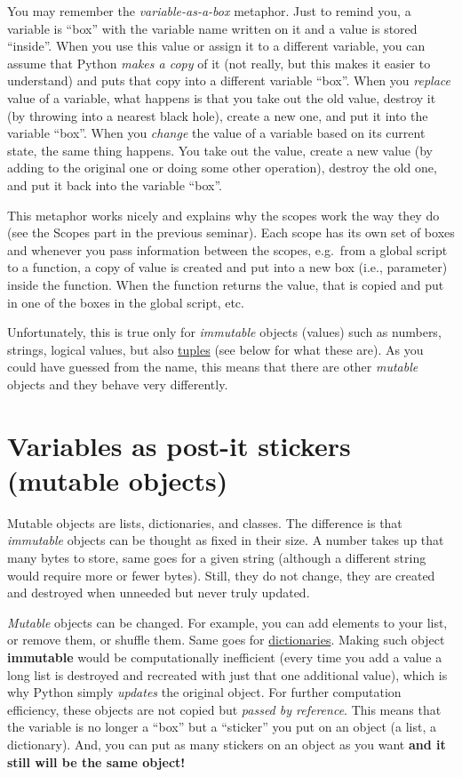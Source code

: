 \documentclass[
]{book}
\begin{document}
You may remember the \emph{variable-as-a-box} metaphor. Just to remind you, a variable is ``box'' with the variable name written on it and a value is stored ``inside''. When you use this value or assign it to a different variable, you can assume that Python \emph{makes a copy} of it (not really, but this makes it easier to understand) and puts that copy into a different variable ``box''. When you \emph{replace} value of a variable, what happens is that you take out the old value, destroy it (by throwing into a nearest black hole), create a new one, and put it into the variable ``box''. When you \emph{change} the value of a variable based on its current state, the same thing happens. You take out the value, create a new value (by adding to the original one or doing some other operation), destroy the old one, and put it back into the variable ``box''.

This metaphor works nicely and explains why the scopes work the way they do (see the Scopes part in the previous seminar). Each scope has its own set of boxes and whenever you pass information between the scopes, e.g.~from a global script to a function, a copy of value is created and put into a new box (i.e., parameter) inside the function. When the function returns the value, that is copied and put in one of the boxes in the global script, etc.

Unfortunately, this is true only for \emph{immutable} objects (values) such as numbers, strings, logical values, but also \href{https://docs.python.org/3/library/stdtypes.html?highlight=tuple\#tuple}{tuples} (see below for what these are). As you could have guessed from the name, this means that there are other \emph{mutable} objects and they behave very differently.

\hypertarget{mutable-objects}{%
\section{Variables as post-it stickers (mutable objects)}\label{mutable-objects}}

Mutable objects are lists, dictionaries, and classes. The difference is that \emph{immutable} objects can be thought as fixed in their size. A number takes up that many bytes to store, same goes for a given string (although a different string would require more or fewer bytes). Still, they do not change, they are created and destroyed when unneeded but never truly updated.

\emph{Mutable} objects can be changed. For example, you can add elements to your list, or remove them, or shuffle them. Same goes for \href{https://docs.python.org/3/tutorial/datastructures.html?highlight=dictionary\#dictionaries}{dictionaries}. Making such object \textbf{immutable} would be computationally inefficient (every time you add a value a long list is destroyed and recreated with just that one additional value), which is why Python simply \emph{updates} the original object. For further computation efficiency, these objects are not copied but \emph{passed by reference}. This means that the variable is no longer a ``box'' but a ``sticker'' you put on an object (a list, a dictionary). And, you can put as many stickers on an object as you want \textbf{and it still will be the same object!}
\end{document}
